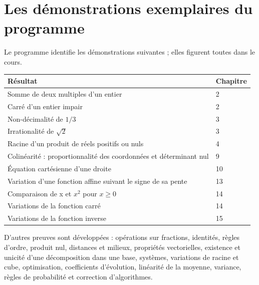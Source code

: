 \documentclass[11pt,a4paper,oneside]{book}
\begin{document}
\section{Les démonstrations exemplaires du programme}
Le programme identifie les démonstrations suivantes ; elles figurent toutes dans le cours.
\begin{center}\begin{tabularx}{\textwidth}{Xl}\toprule
Résultat & Chapitre\\\midrule
Somme de deux multiples d'un entier & 2\\
Carré d'un entier impair & 2\\
Non-décimalité de $1/3$ & 3\\
Irrationalité de $\sqrt2$ & 3\\
Racine d'un produit de réels positifs ou nuls & 4\\
Colinéarité : proportionnalité des coordonnées et déterminant nul & 9\\
Équation cartésienne d'une droite & 10\\
Variation d'une fonction affine suivant le signe de sa pente & 13\\
Comparaison de x et $x^2$ pour $x\ge0$ & 14\\
Variations de la fonction carré & 14\\
Variations de la fonction inverse & 15\\\bottomrule
\end{tabularx}\end{center}
D'autres preuves sont développées : opérations sur fractions, identités, règles d'ordre, produit nul, distances et milieux, propriétés vectorielles, existence et unicité d'une décomposition dans une base, systèmes, variations de racine et cube, optimisation, coefficients d'évolution, linéarité de la moyenne, variance, règles de probabilité et correction d'algorithmes.
\end{document}
